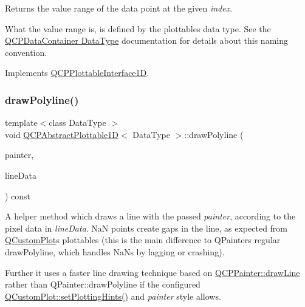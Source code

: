 Returns the value range of the data point at the given {\itshape index}.

What the value range is, is defined by the plottable\textquotesingle{}s data type. See the \hyperlink{classQCPDataContainer_qcpdatacontainer-datatype}{Q\+C\+P\+Data\+Container Data\+Type} documentation for details about this naming convention. 

Implements \hyperlink{classQCPPlottableInterface1D_a9ca7fcf14d885a200879768679b19be9}{Q\+C\+P\+Plottable\+Interface1D}.

\mbox{\label{classQCPAbstractPlottable1D_a7adc6c3cccebb5341f11e0c2b7d54206}} 
\subsubsection{\texorpdfstring{draw\+Polyline()}{drawPolyline()}}
{\footnotesize\ttfamily template$<$class Data\+Type $>$ \\
void \hyperlink{classQCPAbstractPlottable1D}{Q\+C\+P\+Abstract\+Plottable1D}$<$ Data\+Type $>$\+::draw\+Polyline (\begin{DoxyParamCaption}\item[{\hyperlink{classQCPPainter}{Q\+C\+P\+Painter} $\ast$}]{painter,  }\item[{const Q\+Vector$<$ Q\+PointF $>$ \&}]{line\+Data }\end{DoxyParamCaption}) const\hspace{0.3cm}{\ttfamily [protected]}}

A helper method which draws a line with the passed {\itshape painter}, according to the pixel data in {\itshape line\+Data}. NaN points create gaps in the line, as expected from \hyperlink{classQCustomPlot}{Q\+Custom\+Plot}\textquotesingle{}s plottables (this is the main difference to Q\+Painter\textquotesingle{}s regular draw\+Polyline, which handles Na\+Ns by lagging or crashing).

Further it uses a faster line drawing technique based on \hyperlink{classQCPPainter_a0b4b1b9bd495e182c731774dc800e6e0}{Q\+C\+P\+Painter\+::draw\+Line} rather than {\ttfamily Q\+Painter\+::draw\+Polyline} if the configured \hyperlink{classQCustomPlot_a94a33cbdadbbac5934843508bcfc210d}{Q\+Custom\+Plot\+::set\+Plotting\+Hints()} and {\itshape painter} style allows. \mbox{\label{classQCPAbstractPlottable1D_ad0b46d25cde3d035b180fb8f10c056e6}} 
